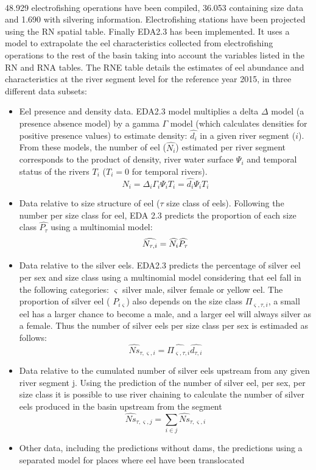 \documentclass[pdftex,12pt,a4paper,svgnames]{report}\usepackage[]{graphicx}\usepackage[]{color}
\begin{document}
\begin{center}
\Huge\textsc{}\\
 \label{RNE}
\end{center}

48.929 electrofishing operations have been compiled, 36.053 containing
size data and 1.690 with silvering information.
Electrofishing stations have been projected using the RN spatial table.
Finally EDA2.3 has been implemented. It uses a model to extrapolate the eel
characteristics collected from electrofishing operations to the
rest of the basin taking into account the variables listed in the RN and RNA
tables. The RNE table details the estimates of eel abundance and
characteristics at the river segment level for the
reference year 2015, in three different data subsets:
\begin{itemize}
\item Eel presence and density data. EDA2.3 model multiplies a delta $\Delta$
model (a presence absence model) by a gamma $\Gamma$ model (which calculates
densities for positive presence values) to estimate density: $\widehat{d_{i}}$
in a given river segment ($i$). From these models, the number of eel
($\widehat{N_i}$) estimated per river segment corresponds to the product of
density, river water surface $\Psi_i$ and temporal status of the rivers $T_i$
($T_i=0$ for temporal rivers).
$$ \widehat{N}_{i} = \Delta_{i} \Gamma_{i} \Psi_i T_i = \widehat{d_{i}}\Psi_i T_i $$
\item Data relative to size structure of eel ($\tau$ size class of eels).
Following the number per size class for eel, EDA 2.3 predicts the proportion of
each size class $\widehat{P_\tau}$ using a multinomial model:
$$\widehat{N_{\tau,i}} = \widehat{N_{i}} \widehat{P_\tau} \\$$
\item Data relative to the silver eels. EDA2.3 predicts the percentage of
silver eel per sex and size class using a multinomial model considering that eel
fall in the following categories: $\varsigma$ silver male, silver female or
yellow eel. The proportion of silver eel ( $P_{i \varsigma}$) also depends on
the size class $\Pi_{\varsigma,\tau,i}$, a small eel has a larger chance to
become a male, and a larger eel will always silver as a female. Thus the number
of silver eels per size class per sex is estimaded as follows:
$$ \widehat{Ns}_{\tau,\varsigma, i}=\widehat{\Pi_{\varsigma,\tau,i}} \widehat{d_{\tau,i}} $$
\item Data relative to the cumulated number of silver eels upstream from any
given river segment j. Using the prediction of the number of silver eel, per
sex, per size class it is possible to use river chaining to calculate the number of
silver eels produced in the basin upstream from the segment
$$
\widehat{Ns}_{\tau,\varsigma, j}=\sum_{i\in j}\widehat{Ns}_{\tau,\varsigma, i}$$
\item Other data, including the predictions without dams, the predictions using
a separated model for places where eel have been translocated
\end{itemize}
\end{document}
